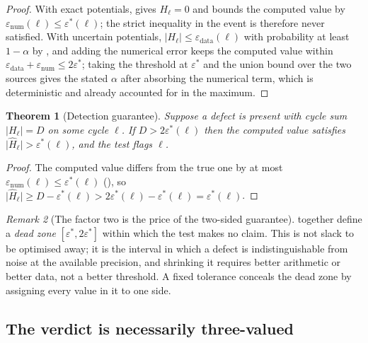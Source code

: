 \documentclass[11pt,twocolumn,a4paper]{article}
\theoremstyle{pstyle}
\newtheorem{theorem}{Theorem}[section]
\theoremstyle{definition}
\theoremstyle{remark}
\newtheorem{remark}[theorem]{Remark}
\newcommand{\abs}[1]{\lvert#1\rvert}
\newcommand{\eps}{\varepsilon}
\newcommand{\epsnum}{\eps_{\mathrm{num}}}
\newcommand{\epsdata}{\eps_{\mathrm{data}}}
\newcommand{\epsstar}{\eps^{\ast}}
\newcommand{\hol}{H}
\begin{document}
\begin{proof}
With exact potentials,  gives $\hol_\ell = 0$ and
 bounds the computed value by $\epsnum(\ell) \le
\epsstar(\ell)$; the strict inequality in the event is therefore never
satisfied. With uncertain potentials, $\abs{\hol_\ell} \le
\epsdata(\ell)$ with probability at least $1-\alpha$ by
, and adding the numerical error keeps the computed
value within $\epsdata + \epsnum \le 2\epsstar$; taking the threshold at
$\epsstar$ and the union bound over the two sources gives the stated
$\alpha$ after absorbing the numerical term, which is deterministic and
already accounted for in the maximum.
\end{proof}

\begin{theorem}[Detection guarantee]
\label{thm:detection}
Suppose a defect is present with cycle sum $\abs{\hol_\ell} = D$ on some
cycle $\ell$. If $D > 2\epsstar(\ell)$ then the computed value satisfies
$\abs{\widehat{\hol}_\ell} > \epsstar(\ell)$, and the test flags $\ell$.
\end{theorem}

\begin{proof}
The computed value differs from the true one by at most
$\epsnum(\ell)\le\epsstar(\ell)$ (), so
$\abs{\widehat{\hol}_\ell} \ge D - \epsstar(\ell) > 2\epsstar(\ell) -
\epsstar(\ell) = \epsstar(\ell)$.
\end{proof}

\begin{remark}[The factor two is the price of the two-sided guarantee]
\label{rem:factor2}
 together define a
\emph{dead zone} $[\epsstar, 2\epsstar]$ within which the test makes no
claim. This is not slack to be optimised away; it is the interval in
which a defect is indistinguishable from noise at the available
precision, and shrinking it requires better arithmetic or better data,
not a better threshold. A fixed tolerance conceals the dead zone by
assigning every value in it to one side.
\end{remark}

\subsection{The verdict is necessarily three-valued}
\end{document}
